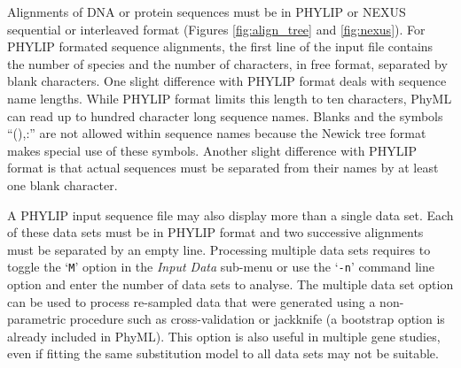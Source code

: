 \documentclass[a4paper,12pt]{article}
\newcommand{\x}[1]{\texttt{#1}}
\begin{document}
Alignments   of   DNA   or   protein   sequences   must  be   in   PHYLIP   or   NEXUS
\cite{maddison97} sequential or interleaved format
(Figures \ref{fig:align_tree}  and \ref{fig:nexus}).  For  PHYLIP formated sequence  alignments, the
first line of  the input file contains the number  of species and the number  of characters, in free
format, separated by blank characters.  One slight difference with PHYLIP format deals with sequence
name  lengths.  While PHYLIP  format limits  this length  to ten  characters, PhyML  can read  up to
hundred  character long sequence  names.  Blanks  and the  symbols ``(),:''  are not  allowed within
sequence names because  the Newick tree format  makes special use of these  symbols.  Another slight
difference with  PHYLIP format is  that actual sequences  must be separated  from their names  by at
least one blank character.

A PHYLIP input sequence file  may also display more than a single data set.  Each of these data sets
must  be  in  PHYLIP   format  and  two  successive  alignments  must  be   separated  by  an  empty
line. Processing multiple  data sets requires to toggle  the `\x{M}' option in the  {\em Input Data}
sub-menu or use the `\x{-n}' command line option  and enter the number of data sets to analyse.  The
multiple  data set  option can  be  used to  process re-sampled  data  that were  generated using  a
non-parametric  procedure such  as  cross-validation or  jackknife  (a bootstrap  option is  already
included in PhyML).  This  option is also useful in multiple gene studies,  even if fitting the same
substitution model to all data sets may not be suitable.
\end{document}
